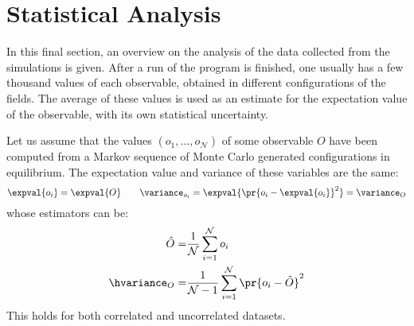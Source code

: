 \section{Statistical Analysis}
In this final section, an overview on the analysis of the data collected from the simulations is given.
After a run of the program is finished, one usually has a few thousand values of each observable, obtained in different configurations of the fields.
The average of these values is used as an estimate for the expectation value of the observable, with its own statistical uncertainty.

Let us assume that the values $(o_1,\dots,o_{\mathcal{N}})$ of some observable $O$ have been computed from a Markov sequence of Monte Carlo generated configurations in equilibrium.
The expectation value and variance of these variables are the same:
\begin{equation}
    \expval{o_i} = \expval{O} \qquad \variance_{o_i} = \expval{\pr{o_i-\expval{o_i}}^2} = \variance_O
\end{equation}
whose estimators can be:
\begin{align}
    \hat{O} =& \frac{1}{\mathcal{N}}\sum_{i=1}^\mathcal{N} o_i \label{2:ExpVal}\\
    \hvariance_O =& \frac1{\mathcal{N}-1}\sum_{i=1}^\mathcal{N}\pr{o_i-\hat{O}}^2 \label{2:Variance}
\end{align}
This holds for both correlated and uncorrelated datasets.


